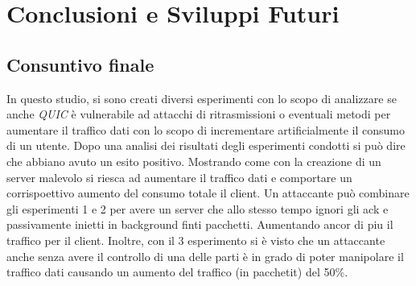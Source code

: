 \chapter{Conclusioni e Sviluppi Futuri}
\label{cap:conclusioni}

\section{Consuntivo finale}

In questo studio, si sono creati diversi esperimenti con lo scopo di analizzare se anche \emph{QUIC} è vulnerabile ad attacchi di ritrasmissioni o 
eventuali metodi per aumentare il traffico dati con lo scopo di incrementare artificialmente il consumo di un utente.
Dopo una analisi dei risultati degli esperimenti condotti si può dire che abbiano avuto un esito positivo. 
Mostrando come con la creazione di un server malevolo si riesca ad aumentare il traffico dati e comportare un corrispoettivo aumento del consumo totale il client. 
Un attaccante può combinare gli esperimenti 1 e 2 per avere un server che allo stesso tempo ignori gli ack e passivamente inietti in background finti pacchetti.
Aumentando ancor di piu il traffico per il client.
Inoltre, con il 3 esperimento si è visto che un attaccante anche senza avere il controllo di una delle parti è in grado di poter manipolare il traffico dati causando un aumento 
del traffico (in pacchetit) del 50\%.

